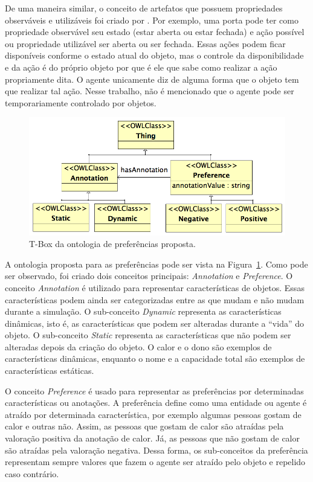 De uma maneira similar, o conceito de artefatos que possuem propriedades
observáveis e utilizáveis foi criado por \citet{ricci31cartago}. Por exemplo,
uma porta pode ter como propriedade observável seu estado (estar aberta ou
estar fechada) e ação possível ou propriedade utilizável ser aberta ou ser
fechada. Essas ações podem ficar disponíveis conforme o estado atual do
objeto, mas o controle da disponibilidade e da ação é do próprio objeto por
que é ele que sabe como realizar a ação propriamente dita. O agente unicamente
diz de alguma forma que o objeto tem que realizar tal ação. Nesse trabalho,
não é mencionado que o agente pode ser temporariamente controlado por
objetos.

\begin{figure}
  \centering
    \includegraphics[width=130mm]{figuras/preferences.png}
  \caption{T-Box da ontologia de preferências proposta.}
  \label{fig:preferences}
\end{figure}

A ontologia proposta para as preferências pode ser vista na
Figura~\ref{fig:preferences}. Como pode ser observado, foi criado dois
conceitos principais: \emph{Annotation} e \emph{Preference}. O conceito
\emph{Annotation} é utilizado para representar características de objetos.
Essas características podem ainda ser categorizadas entre as que mudam
e não mudam durante a simulação. O sub-conceito \emph{Dynamic} representa as
características dinâmicas, isto é, as características que podem ser alteradas
durante a ``vida'' do objeto. O sub-conceito \emph{Static} representa as
características que não podem ser alteradas depois da criação do objeto. O
calor e o dono são exemplos de características dinâmicas, enquanto o nome e a
capacidade total são exemplos de características estáticas.

O conceito \emph{Preference} é usado para representar as preferências por
determinadas características ou anotações. A preferência define como uma entidade ou
agente é atraído por determinada característica, por exemplo algumas pessoas
gostam de calor e outras não. Assim, as pessoas que gostam de calor são
atraídas pela valoração positiva da anotação de calor. Já, as pessoas que não
gostam de calor são atraídas pela valoração negativa. Dessa forma, os
sub-conceitos da preferência representam sempre valores que fazem o agente ser
atraído pelo objeto e repelido caso contrário.


